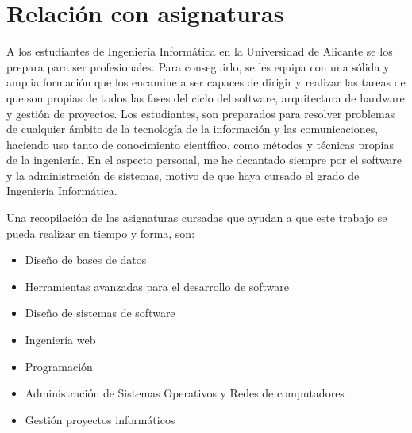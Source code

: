 \section{Relación con asignaturas}
A los estudiantes de Ingeniería Informática en la Universidad de Alicante se los prepara para ser profesionales. Para conseguirlo, se les equipa con una sólida y amplia formación que los encamine a ser capaces de dirigir y realizar las tareas de que son propias de todos las fases del ciclo del software, arquitectura de hardware y gestión de proyectos. Los estudiantes, son preparados para resolver problemas de cualquier ámbito de la tecnología de la información y las comunicaciones, haciendo uso tanto de conocimiento científico, como métodos y técnicas propias de la ingeniería.
En el aspecto personal, me he decantado siempre por el software y la administración de sistemas, motivo de que haya cursado el grado de Ingeniería Informática.
\par Una recopilación de las asignaturas cursadas que ayudan a que este trabajo se pueda realizar en tiempo y forma, son:
\begin{itemize}
    \item Diseño de bases de datos
    \item Herramientas avanzadas para el desarrollo de software
    \item Diseño de sistemas de software
    \item Ingeniería web
    \item Programación
    \item Administración de Sistemas Operativos y Redes de computadores
    \item Gestión proyectos informáticos
\end{itemize}
